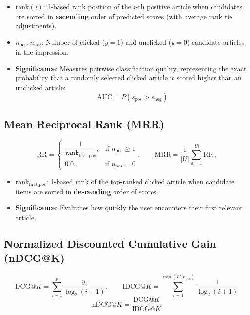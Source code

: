 \documentclass[11pt,a4paper]{article}
\begin{document}
\begin{itemize}
  \item $\text{rank}(i)$: 1-based rank position of the $i$-th positive article when candidates are sorted in \textbf{ascending} order of predicted scores (with average rank tie adjustments).
  \item $n_{\text{pos}}, n_{\text{neg}}$: Number of clicked ($y = 1$) and unclicked ($y = 0$) candidate articles in the impression.
  \item \textbf{Significance}: Measures pairwise classification quality, representing the exact probability that a randomly selected clicked article is scored higher than an unclicked article:
  \begin{equation}
  \text{AUC} = P(s_{\text{pos}} > s_{\text{neg}})
  \end{equation}
\end{itemize}

\subsection{Mean Reciprocal Rank (MRR)}
\begin{equation}
\text{RR} = \begin{cases}
\dfrac{1}{\text{rank}_{\text{first\_pos}}}, & \text{if } n_{\text{pos}} \ge 1 \\
0.0, & \text{if } n_{\text{pos}} = 0
\end{cases}, \qquad
\text{MRR} = \frac{1}{|U|} \sum_{u=1}^{|U|} \text{RR}_u
\end{equation}

\begin{itemize}
  \item $\text{rank}_{\text{first\_pos}}$: 1-based rank of the top-ranked clicked article when candidate items are sorted in \textbf{descending} order of scores.
  \item \textbf{Significance}: Evaluates how quickly the user encounters their first relevant article.
\end{itemize}

\subsection{Normalized Discounted Cumulative Gain (nDCG@K)}
\begin{equation}
\text{DCG}@K = \sum_{i=1}^K \frac{y_i}{\log_2(i + 1)}, \qquad
\text{IDCG}@K = \sum_{i=1}^{\min(K, n_{\text{pos}})} \frac{1}{\log_2(i + 1)}
\end{equation}
\begin{equation}
\text{nDCG}@K = \frac{\text{DCG}@K}{\text{IDCG}@K}
\end{equation}
\end{document}
